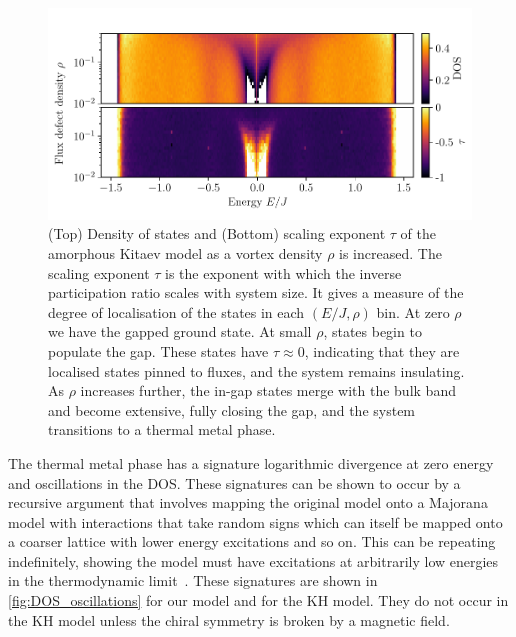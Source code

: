 \hypertarget{fig:DOS_vs_rho}{%
\begin{figure}
\centering
\includegraphics[width=1\textwidth,height=\textheight]{figure_code/amk_chapter/results/DOS_vs_rho/DOS_vs_rho}
\caption[{Transition to a Thermal Metal}]{(Top) Density of states and (Bottom) scaling exponent \(\tau\) of the amorphous Kitaev model as a vortex density \(\rho\) is increased. The scaling exponent \(\tau\) is the exponent with which the inverse participation ratio scales with system size. It gives a measure of the degree of localisation of the states in each \((E/J, \rho)\) bin. At zero \(\rho\) we have the gapped ground state. At small \(\rho\), states begin to populate the gap. These states have \(\tau\approx0\), indicating that they are localised states pinned to fluxes, and the system remains insulating. As \(\rho\) increases further, the in-gap states merge with the bulk band and become extensive, fully closing the gap, and the system transitions to a thermal metal phase.}
\label{fig:DOS_vs_rho}
\end{figure}
}

The thermal metal phase has a signature logarithmic divergence at zero energy and oscillations in the DOS. These signatures can be shown to occur by a recursive argument that involves mapping the original model onto a Majorana model with interactions that take random signs which can itself be mapped onto a coarser lattice with lower energy excitations and so on. This can be repeating indefinitely, showing the model must have excitations at arbitrarily low energies in the thermodynamic limit~\autocite{bocquet_disordered_2000,selfThermallyInducedMetallic2019}. These signatures are shown in \cref{fig:DOS_oscillations} for our model and for the KH model. They do not occur in the KH model unless the chiral symmetry is broken by a magnetic field.

